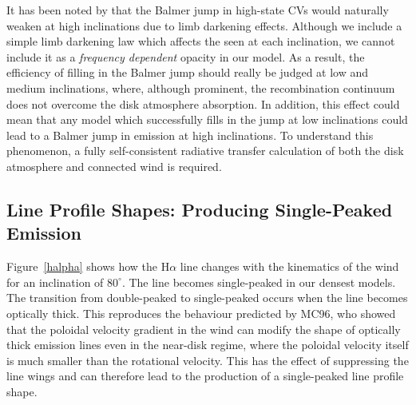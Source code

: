 \documentclass[preprint, a4paper, 11pt]{aastex}
\begin{document}
It has been noted by \cite{ladous1989, ladous1989b}
that the Balmer jump in high-state CVs would naturally weaken at
high inclinations due to limb darkening effects. 
Although we include a simple limb darkening law which affects 
the seen at each inclination, we cannot
include it as a {\em frequency dependent} opacity in our model.
As a result, the efficiency of filling in the Balmer jump
should really be judged at low and medium inclinations, 
where, although prominent, the recombination continuum does
not overcome the disk atmosphere absorption. 
In addition, this effect 
could mean that any model which successfully fills in the 
jump at low inclinations could lead to a Balmer jump 
in emission at high inclinations.
To understand this phenomenon, a fully self-consistent
radiative transfer calculation of both the disk atmosphere
and connected wind is required.


\subsection{Line Profile Shapes: Producing Single-Peaked Emission}

Figure~\ref{halpha} shows how the H$\alpha$
line changes with the kinematics of the wind
for an inclination of $80^\circ$. 
The line becomes single-peaked in our densest models. 
The transition from double-peaked to single-peaked occurs when the 
line becomes optically thick. This reproduces the behaviour predicted by MC96, who
showed that the poloidal velocity gradient in the wind can modify the
shape of optically thick emission lines even in the near-disk regime,
where the poloidal velocity itself is much smaller than the rotational
velocity. This has the effect of suppressing the line wings and
can therefore lead to the production of a single-peaked line profile
shape.
\end{document}
